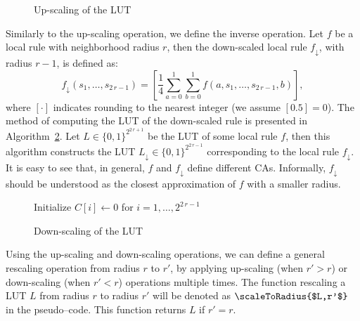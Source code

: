 \begin{figure}[!t]
	\removelatexerror\begin{algorithm}[H]
		\caption{Up-scaling of the LUT}\label{algo:up}
	\end{algorithm}
\end{figure}

Similarly to the up-scaling operation, we define the inverse operation. Let $f$ be a local rule with neighborhood radius $r$, then the down-scaled local rule $f_\downarrow$, with radius $r-1$, is defined as:
\begin{equation*}
	f_\downarrow(s_1,\dotsc,s_{2\,r-1}) = \left[\frac{1}{4}\sum_{a=0}^{1}\sum_{b=0}^{1}f(a,s_1,\dotsc,s_{2\,r-1},b)\right],
\end{equation*}
where $[\cdot]$ indicates rounding to the nearest integer (we assume $[0.5]=0$). The method of computing the LUT of the down-scaled rule is presented in Algorithm~\ref{algo:down}. Let $L\in\{0,1\}^{2^{2\,r+1}}$ be the LUT of some local rule $f$, then this algorithm constructs the LUT $L_\downarrow\in\{0,1\}^{2^{2\,r-1}}$ corresponding to the local rule $f_\downarrow$. It is easy to see that, in general, $f$ and $f_\downarrow$ define different CAs. Informally, $f_\downarrow$ should be understood as the closest approximation of $f$ with a smaller radius.

\begin{figure}[!t]
	\removelatexerror\begin{algorithm}[H]
		Initialize $C[i]\gets 0$ for $i=1,\dotsc,2^{2\,r-1}$\;
		\caption{Down-scaling of the LUT}\label{algo:down}
	\end{algorithm}
\end{figure}

Using the up-scaling and down-scaling operations, we can define a general rescaling operation from radius $r$ to $r'$, by applying up-scaling (when $r'>r$) or down-scaling (when $r'<r$) operations multiple times.
The function rescaling a LUT $L$ from radius $r$ to radius $r'$ will be denoted as $\scaleToRadius{$L,r'$}$ in the pseudo--code. This function returns $L$ if $r'=r$. 

